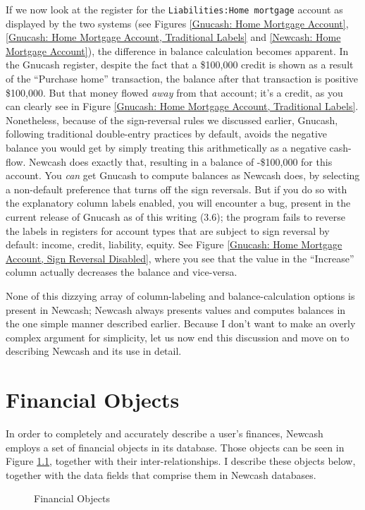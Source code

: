 \documentclass{report}
\newcommand{\graphicsfig}[5]{
\begin{figure}[#5]
\begin{center}
\resizebox{#1}{!}{\texttt{[image: \#2]}}
\end{center}
\caption{#3}
\label{#4}
\end{figure}
}
\begin{document}
If we now look at the register for the \verb+Liabilities:Home mortgage+ account as displayed by the two systems (see Figures  \ref{Gnucash: Home Mortgage Account}, \ref{Gnucash: Home Mortgage Account, Traditional Labels} and \ref{Newcash: Home Mortgage Account}), the difference in balance calculation becomes apparent. In the Gnucash register, despite the fact that a \$100,000 credit is shown as a result of the ``Purchase home'' transaction, the balance after that transaction is positive \$100,000. But that money flowed \emph{away} from that account; it's a credit, as you can clearly see in Figure \ref{Gnucash: Home Mortgage Account, Traditional Labels}. Nonetheless, because of the sign-reversal rules we discussed earlier, Gnucash, following traditional double-entry practices by default, avoids the negative balance you would get by simply treating this arithmetically as a negative cash-flow. Newcash does exactly that, resulting in a balance of -\$100,000 for this account. You \emph{can} get Gnucash to compute balances as Newcash does, by selecting a non-default preference that turns off the sign reversals. But if you do so with the explanatory column labels enabled, you will encounter a bug, present in the current release of Gnucash as of this writing (3.6); the program fails to reverse the labels in registers for account types that are subject to sign reversal by default: income, credit, liability, equity. See Figure \ref{Gnucash: Home Mortgage Account, Sign Reversal Disabled}, where you see that the value in the ``Increase'' column actually decreases the balance and vice-versa.

None of this dizzying array of  column-labeling and balance-calculation options is present in Newcash; Newcash always presents values and computes balances in the one simple manner described earlier.   Because I don't want to make an overly complex argument for simplicity, let us now end this discussion and move on to describing Newcash and its use in detail.

\chapter{Financial Objects}
\label{Financial Objects chapter}
In order to completely and accurately describe a user's finances, Newcash employs a set of financial objects in its database. Those objects can be seen in Figure \ref{Financial Objects}, together with their inter-relationships. I describe these objects below, together with the data fields that comprise them in Newcash databases.
\graphicsfig{5in}{figures/financial_objects.png}{Financial Objects}{Financial Objects}{}
\end{document}

